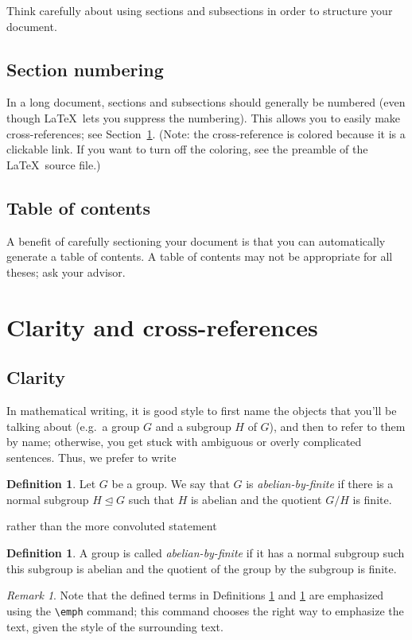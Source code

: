 \documentclass[11pt]{amsart}
\theoremstyle{theorem} %
\theoremstyle{definition}                  %
\newtheorem{defn}[thm]{Definition}
\theoremstyle{example}                       %
\theoremstyle{remark}                       %
\newtheorem{rem}[thm]{Remark}
\numberwithin{equation}{section}
\begin{document}
Think carefully about using sections and subsections in order to structure your document. 

\subsection{Section numbering}

In a long document, sections and subsections should generally be numbered (even though \LaTeX\ lets you suppress the numbering). 
This allows you to easily make cross-references; see Section~\ref{items}. %
(Note: the cross-reference is colored because it is a clickable link. If you want to turn off the coloring, see the preamble of the \LaTeX\ source file.)

\subsection{Table of contents}
A benefit of carefully sectioning your document is that you can automatically generate a table of contents. A table of contents may not be appropriate for all theses; ask your advisor. 

\section{Clarity and cross-references} \label{items}

\subsection{Clarity}
In mathematical writing, it is good style to first name the objects that you'll be talking about (e.g.\ a group $G$ and a subgroup $H$ of $G$), and then to refer to them by name;  otherwise, you get stuck with ambiguous or overly complicated sentences. Thus, we prefer to write 
\begin{defn} \label{def:af1}
Let $G$ be a group. We say that $G$ is \emph{abelian-by-finite} if there is a normal subgroup $H\trianglelefteq G$ such that $H$ is abelian and the quotient $G/H$ is finite.
\end{defn}
rather than the more convoluted statement
\begin{defn}\label{def:af2}
A group is called \emph{abelian-by-finite} if it has a normal subgroup such this subgroup is abelian and the quotient of the group by the subgroup is finite. 
\end{defn}
\begin{rem}
Note that the defined terms in Definitions \ref{def:af1} and \ref{def:af2} are emphasized using the \verb+\emph+ command; this command chooses the right way to emphasize the text, given the style of the surrounding text.
\end{rem}
\end{document}
